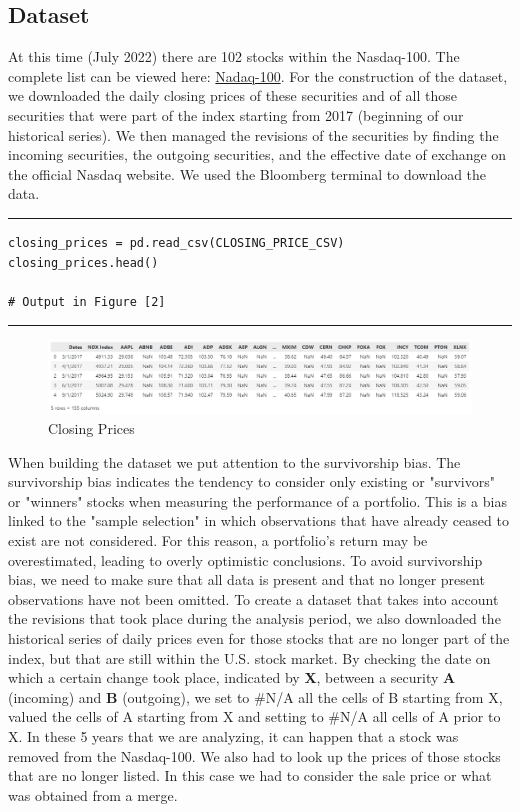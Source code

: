 \documentclass[twocolumn]{article}
\begin{document}
\subsection{Dataset}
At this time (July 2022) there are 102 stocks within the Nasdaq-100. The complete list can be viewed here: \href{https://www.nasdaq.com/market-activity/quotes/nasdaq-ndx-index}{Nadaq-100}.
For the construction of the dataset, we downloaded the daily closing prices of these securities and of all those securities that were part of the index starting from 2017 (beginning of our historical series). We then managed the revisions of the securities by finding the incoming securities, the outgoing securities, and the effective date of exchange on the official Nasdaq website.
We used the Bloomberg terminal to download the data.\\
\rule{\linewidth}{0.4pt}
\vspace{-5 mm}
\begin{verbatim}
closing_prices = pd.read_csv(CLOSING_PRICE_CSV)
closing_prices.head()

# Output in Figure [2]
\end{verbatim}
\vspace{-5 mm}
\rule{\linewidth}{0.4pt}



\begin{figure}[t]
\centering 
\includegraphics[scale=0.5]{closing prices.png}
\caption{Closing Prices}
\end{figure}
When building the dataset we put attention to the survivorship bias. The survivorship bias indicates the tendency to consider only existing or "survivors" or "winners" stocks when measuring the performance of a portfolio. This is a bias linked to the "sample selection" in which observations that have already ceased to exist are not considered. For this reason, a portfolio's return may be overestimated, leading to overly optimistic conclusions. To avoid survivorship bias, we need to make sure that all data is present and that no longer present observations have not been omitted. To create a dataset that takes into account the revisions that took place during the analysis period, we also downloaded the historical series of daily prices even for those stocks that are no longer part of the index, but that are still within the U.S. stock market. By checking the date on which a certain change took place, indicated by \textbf{X}, between a security \textbf{A} (incoming) and \textbf{B} (outgoing), we set to \#N/A all the cells of B starting from X, valued the cells of A starting from X and setting to \#N/A all cells of A prior to X. In these 5 years that we are analyzing, it can happen that a stock was removed from the Nasdaq-100. We also had to look up the prices of those stocks that are no longer listed. In this case we had to consider the sale price or what was obtained from a merge.
\end{document}
